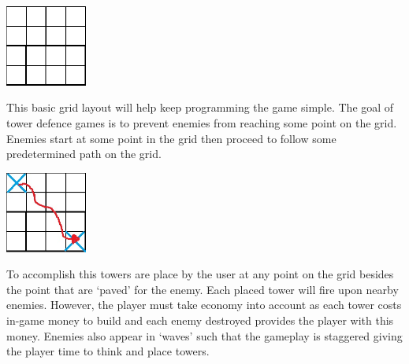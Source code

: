 \documentclass[11pt]{article}
\begin{document}
\begin{center}
    \includegraphics[width=0.2\textwidth]{grid.jpg}
\end{center}




This basic grid layout will help keep programming the game simple. The goal of tower defence games is to prevent enemies from reaching some point on the grid. Enemies start at some point in the grid then proceed to follow some predetermined path on the grid.


\begin{center}
    \includegraphics[width=0.2\textwidth]{path.jpg}
\end{center}


To accomplish this towers are place by the user at any point on the grid besides the point that are `paved' for the enemy. Each placed tower will fire upon nearby enemies. However, the player must take economy into account as each tower costs in-game money to build and each enemy destroyed provides the player with this money. Enemies also appear in `waves' such that the gameplay is staggered giving the player time to think and place towers.
\vspace{3.0 mm}
\end{document}
